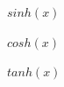 \documentclass{article}
\begin{document}
$ sinh(x) $
\pagebreak

$ cosh(x) $
\pagebreak

$ tanh(x) $
\pagebreak
\end{document}
